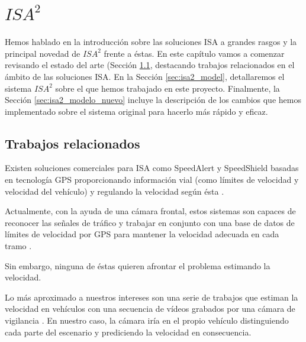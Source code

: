\chapter{$ISA^{2}$}

Hemos hablado en la introducción sobre las soluciones \ac{ISA} a grandes rasgos y la principal novedad de $ISA^{2}$ frente a éstas. En este capítulo vamos a comenzar revisando el estado del arte (Sección \ref{sec:isa2_estado_del_arte}, destacando trabajos relacionados en el ámbito de las soluciones \ac{ISA}. En la Sección \ref{sec:isa2_model}, detallaremos el sistema $ISA^{2}$ sobre el que hemos trabajado en este proyecto. Finalmente, la Sección \ref{sec:isa2_modelo_nuevo} incluye la descripción de los cambios que hemos implementado sobre el sistema original para hacerlo más rápido y eficaz.


\section{Trabajos relacionados}
\label{sec:isa2_estado_del_arte}

Existen soluciones comerciales para \ac{ISA} como SpeedAlert \cite{soluciones_comerciales} y SpeedShield basadas en tecnología GPS proporcionando información vial (como límites de velocidad y velocidad del vehículo) y regulando la velocidad según ésta \cite{speedshield}.

Actualmente, con la ayuda de una cámara frontal, estos sistemas son capaces de reconocer las señales de tráfico y trabajar en conjunto con una base de datos de límites de velocidad por GPS para mantener la velocidad adecuada en cada tramo \cite{sol_img}.

Sin embargo, ninguna de éstas quieren afrontar el problema estimando la velocidad.

Lo más aproximado a nuestros intereses son una serie de trabajos que estiman la velocidad en vehículos con una secuencia de vídeos grabados por una cámara de vigilancia \cite{isa2} \cite{shukla}. En nuestro caso, la cámara iría en el propio vehículo distinguiendo cada parte del escenario y prediciendo la velocidad en consecuencia.


